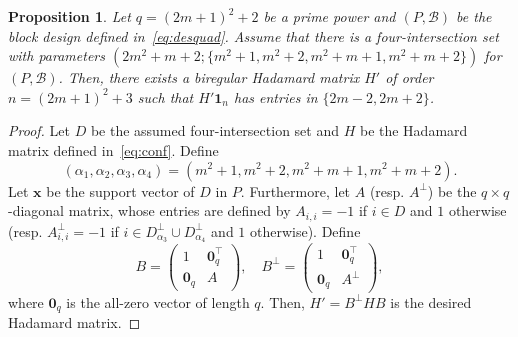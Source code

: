 \documentclass[10pt]{amsart}
\newtheorem{prop}[theo]{Proposition}
\theoremstyle{definition}
\newcommand*\tra{\top}
\newcommand*{\un}{\mathbf{1}}
\newcommand*{\bfx}{\mathbf{x}}
\newcommand*{\bfo}{\mathbf{0}}
\begin{document}
\begin{prop}\label{prop:const1}
Let $q=(2m+1)^2+2$ be a prime power and $(P,{\mathcal B})$ be the block design defined in~\eqref{eq:desquad}. Assume that there is a four-intersection set with parameters $(2m^2+m+2;\{m^2+1,m^2+2,m^2+m+1,m^2+m+2\})$ for $(P,{\mathcal B})$. Then, there exists a biregular Hadamard matrix $H'$ of order $n=(2m+1)^2+3$ such that $H'\un_n$ has entries in $\{2m-2,2m+2\}$.
\end{prop}
\begin{proof}
Let $D$ be the assumed four-intersection set and $H$ be the Hadamard matrix defined in~\eqref{eq:conf}. Define
\[
(\alpha_1,\alpha_2,\alpha_3,\alpha_4)=(m^2+1,m^2+2,m^2+m+1,m^2+m+2).
\]
Let $\bfx$ be the support vector of $D$ in $P$. Furthermore, let $A$ (resp. $A^\perp$) be the $q\times q$-diagonal matrix, whose entries are defined by $A_{i,i}=-1$ if $i\in D$ and $1$ otherwise (resp. $A^\perp_{i,i}=-1$ if $i\in D_{\alpha_3}^\perp \cup D_{\alpha_4}^\perp$ and $1$ otherwise). Define
\[
B=
\begin{pmatrix} 1 & \bfo_q^\tra \\ \bfo_q & A
\end{pmatrix}, \quad
B^\perp=
\begin{pmatrix} 1 & \bfo_q^\tra \\ \bfo_q & A^\perp
\end{pmatrix},
\]
where $\bfo_q$ is the all-zero vector of length $q$. Then, $H'=B^\perp H B$ is the desired Hadamard matrix.


\end{proof}
\end{document}
